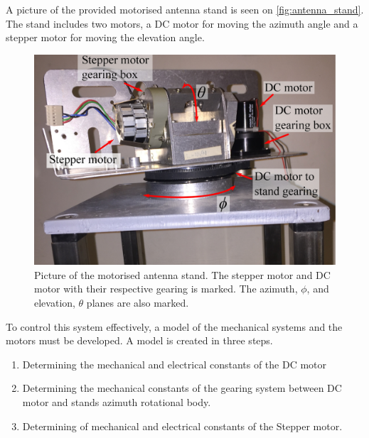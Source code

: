 A picture of the provided motorised antenna stand is seen on \autoref{fig:antenna_stand}. The stand includes two motors, a DC motor for moving the azimuth angle and a stepper motor for moving the elevation angle.
\begin{figure}[h!]
	\centering
	\includegraphics[width=\textwidth]{figures/technical/stand}
	\caption{Picture of the motorised antenna stand. The stepper motor and DC motor with their respective gearing is marked. The azimuth, $\phi$, and elevation, $\theta$ planes are also marked.}
	\label{fig:antenna_stand}
\end{figure}

\newpage
To control this system effectively, a model of the mechanical systems and the motors must be developed.
A model is created in three steps.
\begin{enumerate}
\item Determining the mechanical and electrical constants of the DC motor
\item Determining the mechanical constants of the gearing system between DC motor and stands azimuth rotational body.
\item Determining of mechanical and electrical constants of the Stepper motor.
\end{enumerate}
